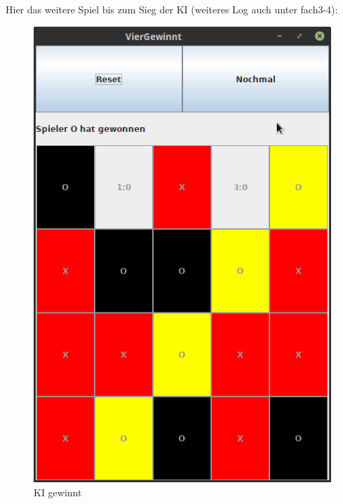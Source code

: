 \documentclass[12pt,a4paper]{article}
\begin{document}
	Hier das weitere Spiel bis zum Sieg der KI (weiteres Log auch unter fach3-4):\\
	\begin{figure}[h]
		\centering
		\includegraphics[width=0.4\linewidth, height=0.3\textheight]{maybe/fach4}
		\caption{KI gewinnt}
		\label{fig:fach4}
	\end{figure}
	\\
\end{document}
